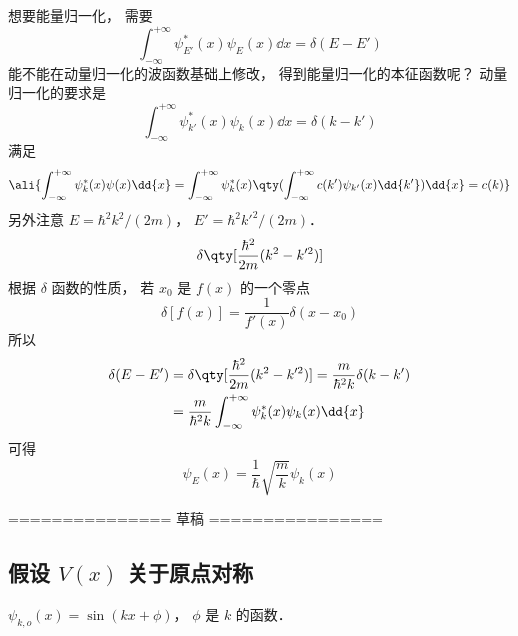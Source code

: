 想要能量归一化， 需要
\begin{equation}
\int_{-\infty}^{+\infty} \psi_{E'}^*(x) \psi_E(x) \dd{x}  = \delta (E - E')
\end{equation}
能不能在动量归一化的波函数基础上修改， 得到能量归一化的本征函数呢？
动量归一化的要求是
\begin{equation}
\int_{-\infty}^{+\infty} \psi_{k'}^*(x) \psi_k(x) \dd{x}  = \delta(k - k')
\end{equation}
满足
\begin{equation}\ali{
\int_{-\infty}^{+\infty} \psi_k^*(x) \psi(x) \dd{x}
= \int_{-\infty}^{+\infty} \psi_k^*(x) \qty(\int_{-\infty}^{+\infty} c(k')\psi_{k'}(x) \dd{k'}) \dd{x}
= c(k)
}\end{equation}
另外注意 $E = \hbar ^2 k^2/(2m)$， $E' = \hbar^2k'^2/(2m)$． 
\begin{equation}
\delta \qty[ \frac{\hbar ^2}{2m}(k^2 - k'^2)]
\end{equation}
根据 $\delta $ 函数的性质， 若 $x_0$ 是 $f(x)$ 的一个零点
\begin{equation}
\delta[f(x)] = \frac{1}{f'(x)}\delta (x - x_0)
\end{equation}
所以
\begin{equation}
\begin{aligned}
\delta (E - E') & = \delta \qty[\frac{\hbar^2}{2m}(k^2 - k'^2)] = \frac{m}{\hbar ^2 k}\delta (k - k') \\
&= \frac{m}{\hbar^2 k}\int_{-\infty }^{+\infty } \psi_k^*(x) \psi_k(x)\dd{x} 
\end{aligned}
\end{equation}
可得
\begin{equation}
\psi_E (x) = \frac{1}{\hbar} \sqrt{\frac{m}{k}} \psi_k(x)
\end{equation}


=============== 草稿 ================

\subsection{假设 $V(x)$ 关于原点对称}
$\psi_{k,o}(x) = \sin(kx + \phi)$， $\phi$ 是 $k$ 的函数． 

